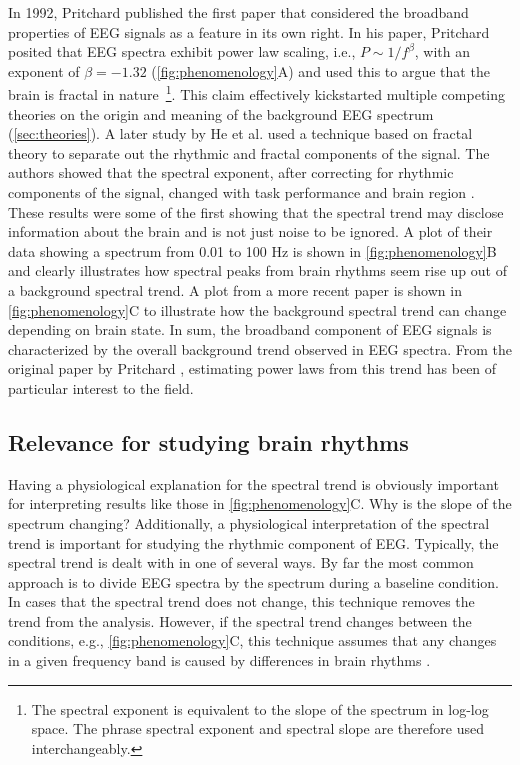 In 1992, Pritchard \cite{Pritchard1992} published the first paper that considered the broadband properties of EEG signals as a feature in its own right. In his paper, Pritchard posited that EEG spectra exhibit power law scaling, i.e., $P\sim1/f^\beta$, with an exponent of $\beta=-1.32$ (\autoref{fig:phenomenology}A) and used this to argue that the brain is fractal in nature~\footnote[2]{The spectral exponent is equivalent to the slope of the spectrum in log-log space. The phrase spectral exponent and spectral slope are therefore used interchangeably.}. This claim effectively kickstarted multiple competing theories on the origin and meaning of the background EEG spectrum (\autoref{sec:theories}). A later study by He et al.\cite{He2010} used a technique based on fractal theory to separate out the rhythmic and fractal components of the signal. The authors showed that the spectral exponent, after correcting for rhythmic components of the signal, changed with task performance and brain region \cite{He2010}. These results were some of the first showing that the spectral trend may disclose information about the brain and is not just noise to be ignored. A plot of their data showing a spectrum from 0.01 to 100 \unit{\hertz} is shown in \autoref{fig:phenomenology}B and clearly illustrates how spectral peaks from brain rhythms seem rise up out of a background spectral trend. A plot from a more recent paper \cite{Colombo2019} is shown in \autoref{fig:phenomenology}C to illustrate how the background spectral trend can change depending on brain state. In sum, the broadband component of EEG signals is characterized by the overall background trend observed in EEG spectra. From the original paper by Pritchard \cite{Pritchard1992}, estimating power laws from this trend has been of particular interest to the field.

\subsection{Relevance for studying brain rhythms} \label{sec:detrending}
Having a physiological explanation for the spectral trend is obviously important for interpreting results like those in \autoref{fig:phenomenology}C. Why is the slope of the spectrum changing?
Additionally, a physiological interpretation of the spectral trend is important for studying the rhythmic component of EEG. Typically, the spectral trend is dealt with in one of several ways. By far the most common approach is to divide EEG spectra by the spectrum during a baseline condition. In cases that the spectral trend does not change, this technique removes the trend from the analysis. However, if the spectral trend changes between the conditions, e.g., \autoref{fig:phenomenology}C, this technique assumes that any changes in a given frequency band is caused by differences in brain rhythms \cite{Gerster2022}.

